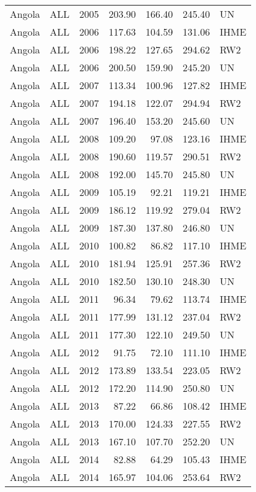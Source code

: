 \begin{longtable}{lllrrrl}
  Angola & ALL & 2005 & 203.90 & 166.40 & 245.40 & UN \\ 
  Angola & ALL & 2006 & 117.63 & 104.59 & 131.06 & IHME \\ 
  Angola & ALL & 2006 & 198.22 & 127.65 & 294.62 & RW2 \\ 
  Angola & ALL & 2006 & 200.50 & 159.90 & 245.20 & UN \\ 
  Angola & ALL & 2007 & 113.34 & 100.96 & 127.82 & IHME \\ 
  Angola & ALL & 2007 & 194.18 & 122.07 & 294.94 & RW2 \\ 
  Angola & ALL & 2007 & 196.40 & 153.20 & 245.60 & UN \\ 
  Angola & ALL & 2008 & 109.20 & 97.08 & 123.16 & IHME \\ 
  Angola & ALL & 2008 & 190.60 & 119.57 & 290.51 & RW2 \\ 
  Angola & ALL & 2008 & 192.00 & 145.70 & 245.80 & UN \\ 
  Angola & ALL & 2009 & 105.19 & 92.21 & 119.21 & IHME \\ 
  Angola & ALL & 2009 & 186.12 & 119.92 & 279.04 & RW2 \\ 
  Angola & ALL & 2009 & 187.30 & 137.80 & 246.80 & UN \\ 
  Angola & ALL & 2010 & 100.82 & 86.82 & 117.10 & IHME \\ 
  Angola & ALL & 2010 & 181.94 & 125.91 & 257.36 & RW2 \\ 
  Angola & ALL & 2010 & 182.50 & 130.10 & 248.30 & UN \\ 
  Angola & ALL & 2011 & 96.34 & 79.62 & 113.74 & IHME \\ 
  Angola & ALL & 2011 & 177.99 & 131.12 & 237.04 & RW2 \\ 
  Angola & ALL & 2011 & 177.30 & 122.10 & 249.50 & UN \\ 
  Angola & ALL & 2012 & 91.75 & 72.10 & 111.10 & IHME \\ 
  Angola & ALL & 2012 & 173.89 & 133.54 & 223.05 & RW2 \\ 
  Angola & ALL & 2012 & 172.20 & 114.90 & 250.80 & UN \\ 
  Angola & ALL & 2013 & 87.22 & 66.86 & 108.42 & IHME \\ 
  Angola & ALL & 2013 & 170.00 & 124.33 & 227.55 & RW2 \\ 
  Angola & ALL & 2013 & 167.10 & 107.70 & 252.20 & UN \\ 
  Angola & ALL & 2014 & 82.88 & 64.29 & 105.43 & IHME \\ 
  Angola & ALL & 2014 & 165.97 & 104.06 & 253.64 & RW2 \\ 

\end{longtable}
